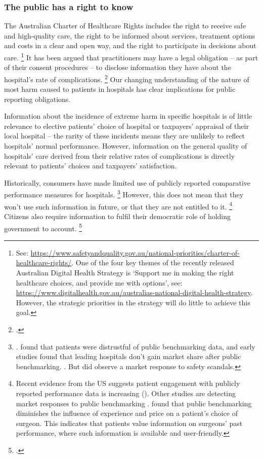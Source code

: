 \documentclass[FrontPage]{grattan}
\begin{document}
\subsubsection{The public has a right to know}\label{subsubsec:the-public-has-a-right-to-know}

The Australian Charter of Healthcare Rights includes the right to receive safe and high-quality care, the right to be informed about services, treatment options and costs in a clear and open way, and the right to participate in decisions about care.%
	\footnote{See: \textcolor{blue}{\url{https://www.safetyandquality.gov.au/national-priorities/charter-of-healthcare-rights/}}. One of the four key themes of the recently released Australian Digital Health Strategy is `Support me in making the right healthcare choices, and provide me with options', see: \textcolor{blue}{\url{https://www.digitalhealth.gov.au/australias-national-digital-health-strategy}}.
	However, the strategic priorities in the strategy will do little to achieve this goal.}
It has been argued that practitioners may have a legal obligation -- as part of their consent procedures -- to disclose information they have about the hospital's rate of complications.%
	\footcite{McWhirter_2017}
Our changing understanding of the nature of most harm caused to patients in hospitals has clear implications for public reporting obligations.

Information about the incidence of extreme harm in specific hospitals is of little relevance to elective patients' choice of hospital or taxpayers' appraisal of their local hospital -- the rarity of these incidents means they are unlikely to reflect hospitals' normal performance.
However, information on the general quality of hospitals' care derived from their relative rates of complications is directly relevant to patients' choices and taxpayers' satisfaction.

Historically, consumers have made limited use of publicly reported comparative performance measures for hospitals.%
	\footnote{\textcite{Greenhalgh_2017}.
	\textcite{Marshall-etal-2000-public-release} found that patients were distrustful of public benchmarking data, and early studies found that leading hospitals don't gain market share after public benchmarking. \textcites{Vladeck_1988}{Weller_2010}{Chassin_2002}{Hibbard_2005}{Jha_2010}.
	But \textcite{mennemeyer1997death} did observe a market response to safety scandals.}
However, this does not mean that they won't use such information in future, or that they are not entitled to it.%
	\footnote{Recent evidence from the US suggests patient engagement with publicly reported performance data is increasing (\textcites{Carman_2016}{Findlay_2016}).
	Other studies are detecting market responses to public benchmarking \textcites{Merle_2009}{Pope_2009}{chen2012public}{Blake_2017}.
	\textcite{Mukamel_2004}
	found that public benchmarking diminishes the influence of experience and price on a patient's choice of surgeon.
	This indicates that patients value information on surgeons' past performance, where such information is available and user-friendly.}
Citizens also require information to fulfil their democratic role of holding government to account.%
	\footcite{Levay_2016}
\end{document}
